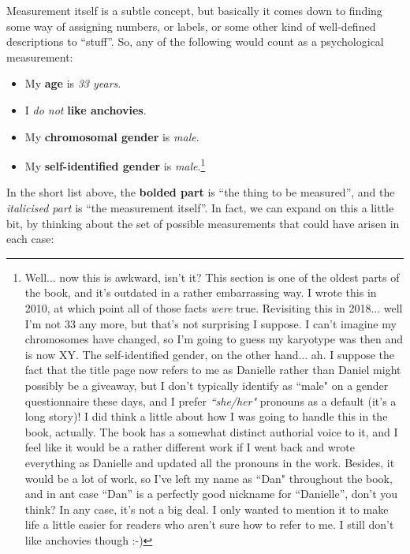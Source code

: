 
Measurement itself is a subtle concept, but basically it comes down to finding some way of assigning numbers, or labels, or some other kind of well-defined descriptions to ``stuff''. So, any of the following would count as a psychological measurement:

\begin{itemize} \itemsep 0pt
\item My {\bf age} is {\it 33 years}.
\item I {\it do not} {\bf like anchovies}.
\item My {\bf chromosomal gender} is {\it male}. 
\item My {\bf self-identified gender} is {\it male}.\footnote{Well... now this is awkward, isn't it? This section is one of the oldest parts of the book, and it's outdated in a rather embarrassing way. I wrote this in 2010, at which point all of those facts {\it were} true. Revisiting this in 2018... well I'm not 33 any more, but that's not surprising I suppose. I can't imagine my chromosomes have changed, so I'm going to guess my karyotype was then and is now XY. The self-identified gender, on the other hand... ah. I suppose the fact that the title page now refers to me as Danielle rather than Daniel might possibly be a giveaway, but I don't typically identify as ``male" on a gender questionnaire these days, and I prefer {\it ``she/her"} pronouns as a default (it's a long story)!  I did think a little about how I was going to handle this in the book, actually. The book has a somewhat distinct authorial voice to it, and I feel like it would be a rather different work if I went back and wrote everything as Danielle and updated all the pronouns in the work. Besides, it would be a lot of work, so I've left my name as  ``Dan" throughout the book, and in ant case ``Dan'' is a perfectly good nickname for ``Danielle'', don't you think? In any case, it's not a big deal. I only wanted to mention it to make life a little easier for readers who aren't sure how to refer to me. I still don't like anchovies though :-)} 
\end{itemize}

In the short list above, the {\bf  bolded part} is ``the thing to be measured'', and the {\it italicised part} is ``the measurement itself''. In fact, we can expand on this a little bit, by thinking about the set of possible measurements that could have arisen in each case:

